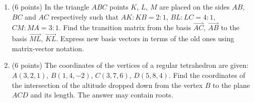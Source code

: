 \documentclass[]{exam}
\begin{document}
\begin{enumerate}





\item (6 points)   
In the triangle $ABC$ points $K$, $L$, $M$ are placed on the sides $AB$, $BC$ and $AC$ respectively such that $AK : KB = 2 : 1$, $BL : LC = 4 : 1$, $CM : MA = 3 : 1$. Find the transition matrix from the basis $\overrightarrow{AC}$, $\overrightarrow{AB}$ to the basis $\overrightarrow{ML}$, $\overrightarrow{KL}$. Express new basis vectors in terms of the old ones using matrix-vector notation.




\item (6 points) The coordinates of the vertices of a regular tetrahedron are given: $A(3,2,1)$, $B(1,4,-2)$, $C(3,7,6)$, $D(5,8,4)$. Find the coordinates of the intersection of the altitude dropped down from the vertex $B$ to the plane $ACD$ and its length. The answer may contain roots. 


\end{enumerate}
\end{document}
